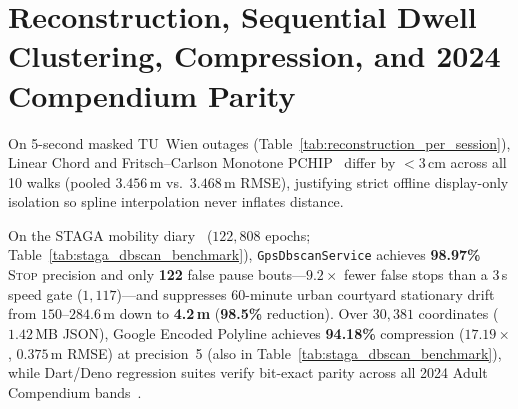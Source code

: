 \section{Reconstruction, Sequential Dwell Clustering, Compression, and 2024 Compendium Parity}
\label{sec:eval_calorie_drift}
On 5-second masked TU~Wien outages (Table~\ref{tab:reconstruction_per_session}), Linear Chord and Fritsch--Carlson Monotone PCHIP~\cite{fritsch1980pchip} differ by $<3$\,cm across all 10 walks (pooled $3.456$\,m vs.\ $3.468$\,m RMSE), justifying strict offline display-only isolation so spline interpolation never inflates distance.

On the STAGA mobility diary~\cite{spang2022staga} ($122{,}808$ epochs; Table~\ref{tab:staga_dbscan_benchmark}), \texttt{GpsDbscanService} achieves \textbf{98.97\%} \textsc{Stop} precision and only \textbf{122} false pause bouts---$9.2\times$ fewer false stops than a $3$\,s speed gate ($1{,}117$)---and suppresses $60$-minute urban courtyard stationary drift from $150$--$284.6$\,m down to \textbf{4.2\,m} (\textbf{98.5\%} reduction). Over $30{,}381$ coordinates ($1.42$\,MB JSON), Google Encoded Polyline achieves \textbf{94.18\%} compression ($17.19\times$, $0.375$\,m RMSE) at precision~5 (also in Table~\ref{tab:staga_dbscan_benchmark}), while Dart/Deno regression suites verify bit-exact parity across all 2024 Adult Compendium bands~\cite{herrmann2024compendium}.

\begin{table}[htbp]
\centering
\caption{Per-Session Outage Reconstruction vs.\ Leica RTK Truth ($5$\,s Gaps, Display-Only Isolation).}
\label{tab:reconstruction_per_session}
\end{table}

